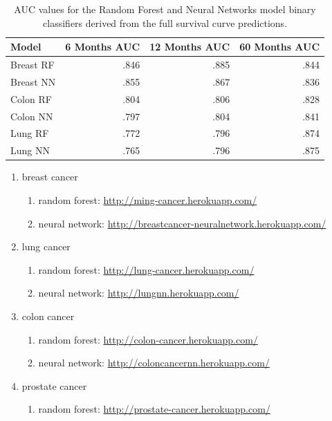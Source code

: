 \documentclass[a4paper,11pt]{article}
\begin{document}
\begin{table}[tbp]
\begin{center}
\begin{tabular}{lrrr}
\toprule
Model & 6 Months AUC & 12 Months AUC & 60 Months AUC \\ 
\midrule
Breast RF &  .846       &     .885           &  .844 \\ 
Breast NN &   .855      &     .867      &    .836 \\ 
Colon RF  &     .804          &      .806           &      .828           \\ 
Colon NN   &     .797          &          .804         &   .841  \\ 
Lung RF    &      .772               &        .796               &   .874  \\ 
Lung NN    &        .765              &        .796               &  .875  \\
\bottomrule
\end{tabular}
\caption{\label{tab:AUC} AUC values for the Random Forest and Neural Networks model
binary classifiers derived from the full survival curve predictions.}
\end{center}
\end{table}



\begin{enumerate}[noitemsep]
\item breast cancer 
    \begin{enumerate}[noitemsep]
    \item random forest: \url{http://ming-cancer.herokuapp.com/}
    \item neural network: \url{http://breastcancer-neuralnetwork.herokuapp.com/}
    \end{enumerate}
\item lung cancer
   \begin{enumerate}[noitemsep]
   \item random forest: \url{http://lung-cancer.herokuapp.com/}
   \item neural network: \url{http://lungnn.herokuapp.com/}
    \end{enumerate}
\item colon cancer
  \begin{enumerate}[noitemsep]
   \item random forest: \url{http://colon-cancer.herokuapp.com/}
   \item neural network: \url{http://coloncancernn.herokuapp.com/}
   \end{enumerate}
\item prostate cancer
  \begin{enumerate}[noitemsep]
   \item random forest: \url{http://prostate-cancer.herokuapp.com/}
   \end{enumerate}
\end{enumerate}
\end{document}
